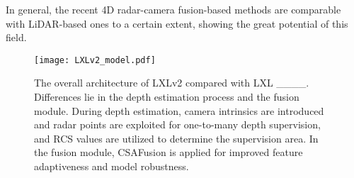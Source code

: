 In general, the recent 4D radar-camera fusion-based methods are comparable with LiDAR-based ones to a certain extent, showing the great potential of this field.
\begin{figure*}
    \centering
    \texttt{[image: LXLv2\_model.pdf]} \vspace{-3mm}
    \caption{The overall architecture of LXLv2 compared with LXL ____. Differences lie in the depth estimation process and the fusion module. During depth estimation, camera intrinsics are introduced and radar points are exploited for one-to-many depth supervision, and RCS values are utilized to determine the supervision area. In the fusion module, CSAFusion is applied for improved feature adaptiveness and model robustness.}
    \label{fig:LXLv2} \vspace{-5mm}
\end{figure*}

\vspace{-3mm}